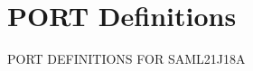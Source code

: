 \hypertarget{group___s_a_m_l21_j18_a__port}{}\section{P\+O\+R\+T Definitions}
\label{group___s_a_m_l21_j18_a__port}
P\+O\+R\+T D\+E\+F\+I\+N\+I\+T\+I\+O\+N\+S F\+O\+R S\+A\+M\+L21\+J18\+A 